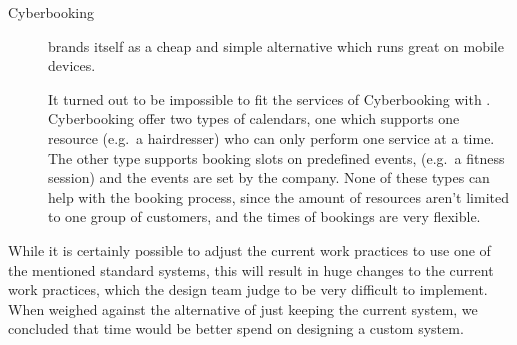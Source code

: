 \begin{description}
\item[Cyberbooking] brands itself as a cheap and simple alternative which runs great 
on mobile devices. 

It turned out to be impossible to fit the services of Cyberbooking with \gomonkey{}. 
Cyberbooking offer two types of 
calendars, one which supports one resource (e.g.\ a hairdresser) who can only
perform one service at a time. The other type supports booking slots on 
predefined events, (e.g.\ a fitness session) and the events are set by the 
company. None of these types can help \gomonkey{} with the booking process,
since the amount of resources aren't limited to one group of customers, and 
the times of bookings are very flexible.
\end{description}

While it is certainly possible to adjust the current work practices to use one of the
mentioned standard systems, this will result in huge changes to the current work
practices, which the design team judge to be very difficult to implement. When weighed
against the alternative of just keeping the current system, we concluded that time would 
be better spend on designing a custom system.





